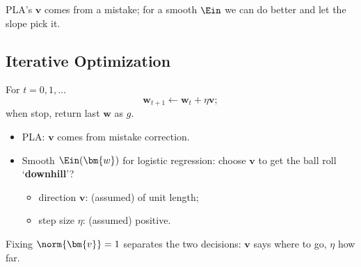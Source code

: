 
PLA's \(\bm{v}\) comes from a mistake; for a smooth \(\Ein\) we can do better
and let the slope pick it.

\subsection{Iterative Optimization}

For \(t = 0, 1, \dots\)
\[
    \bm{w}_{t+1} \gets \bm{w}_t + \eta \bm{v} ;
\]
when stop, return last \(\bm{w}\) as \(g\).

\begin{center}
    \begin{minipage}[c]{0.62\textwidth}
        \begin{itemize}
            \item PLA: \(\bm{v}\) comes from mistake correction.
            \item Smooth \(\Ein(\bm{w})\) for logistic regression: choose
                \(\bm{v}\) to get the ball roll `\textbf{downhill}'?
            \begin{itemize}
                \item direction \(\bm{v}\): (assumed) of unit length;
                \item step size \(\eta\): (assumed) positive.
            \end{itemize}
        \end{itemize}
    \end{minipage}%
    \begin{minipage}[c]{0.34\textwidth}
        \centering
    \end{minipage}
\end{center}

Fixing \(\norm{\bm{v}} = 1\) separates the two decisions: \(\bm{v}\) says where
to go, \(\eta\) how far.

